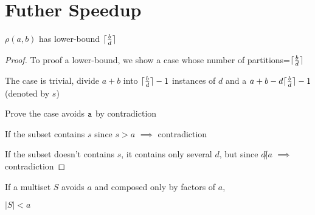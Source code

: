 \section{Futher Speedup}

\begin{lemma}
$\rho(a,b)$ has lower-bound $\lceil\frac{b}{d}\rceil$
\end{lemma} 

\begin{proof}
To proof a lower-bound, we show a case whose number of partitions=$\lceil\frac{b}{d}\rceil$

The case is trivial, divide $a+b$ into $\lceil\frac{b}{d}\rceil-1$ instances of $d$ and a $a+b-d\lceil\frac{b}{d}\rceil-1$ (denoted by $s$)

Prove the case avoids $\mathtt{a}$ by contradiction

If the subset contains $s$ since $s>a$ $\implies$ contradiction

If the subset doesn't contains $s$, it contains only several $d$, but since $d\not| a$ $\implies$ contradiction
\end{proof}

\begin{lemma}
If a multiset $S$ avoids $a$ and composed only by factors of $a$, 

$|S|<a$
\end{lemma}

